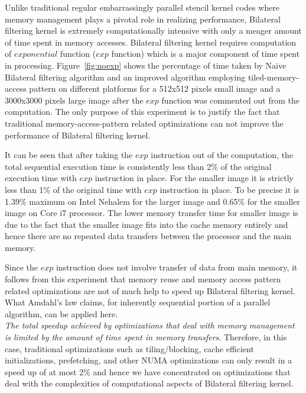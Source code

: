 \documentclass{IEEEtran}
\begin{document}
Unlike traditional regular embarrassingly parallel stencil kernel codes where memory management plays a pivotal role in realizing performance, Bilateral filtering kernel is extremely computationally intensive with only a meager amount of time spent in memory accesses. Bilateral filtering kernel requires computation of $exponential$ function ($exp$ function) which is a major component of time spent in processing. Figure~\ref{fig:noexp} shows the percentage of time taken by Naive Bilateral filtering algorithm\cite{Tomasi1998} and an improved algorithm employing tiled-memory-access pattern on different platforms for a 512x512 pixels small image and a 3000x3000 pixels large image after the $exp$ function was commented out from the computation. The only purpose of this experiment is to justify the fact that traditional memory-access-pattern related optimizations can not improve the performance of Bilateral filtering kernel.

It can be seen that after taking the $exp$ instruction out of the computation, the total sequential execution time is consistently less than 2\% of the original execution time with $exp$ instruction in place. For the smaller image it is strictly less than 1\% of the original time with $exp$ instruction in place. To be precise it is 1.39\% maximum on Intel Nehalem for the larger image and 0.65\% for the smaller image on Core i7 processor. The lower memory transfer time for smaller image is due to the fact that the smaller image fits into the cache memory entirely and hence there are no repeated data transfers between the processor and the main memory.

Since the $exp$ instruction does not involve transfer of data from main memory, it follows from this experiment that memory reuse and memory access pattern related optimizations are not of much help to speed up Bilateral filtering kernel. What Amdahl's law claims, for inherently sequential portion of a parallel algorithm, can be applied here. \\ \textit{The total speedup achieved by optimizations that deal with memory management is limited by the amount of time spent in memory transfers}. Therefore, in this case, traditional optimizations such as tiling/blocking, cache efficient initializations, prefetching, and other NUMA optimizations can only result in a speed up of at most 2\% and hence we have concentrated on optimizations that deal with the complexities of computational aspects of Bilateral filtering kernel.
\end{document}
